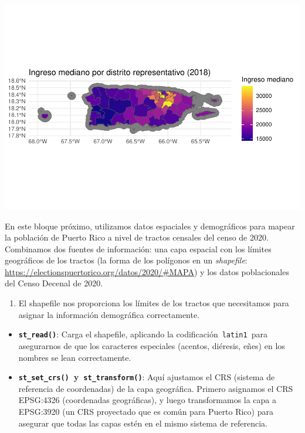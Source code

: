 \documentclass[
]{article}
\providecommand{\tightlist}{%
  \setlength{\itemsep}{0pt}\setlength{\parskip}{0pt}}
\begin{document}
\includegraphics{Taller-2_files/figure-latex/Ingreso mediano en mapa-1.pdf}

En este bloque próximo, utilizamos datos espaciales y demográficos para
mapear la población de Puerto Rico a nivel de tractos censales del censo
de 2020. Combinamos dos fuentes de información: una capa espacial con
los límites geográficos de los tractos (la forma de los polígonos en un
\emph{shapefile}:
\url{https://electionspuertorico.org/datos/2020/\#MAPA}) y los datos
poblacionales del Censo Decenal de 2020.

\begin{enumerate}
\def\labelenumi{\arabic{enumi}.}
\tightlist
\item
  El shapefile nos proporciona los límites de los tractos que
  necesitamos para asignar la información demográfica correctamente.
\end{enumerate}

\begin{itemize}
\item
  \textbf{\texttt{st\_read()}}: Carga el shapefile, aplicando la
  codificación~\texttt{latin1}~para asegurarnos de que los caracteres
  especiales (acentos, diéresis, eñes) en los nombres se lean
  correctamente.
\item
  \textbf{\texttt{st\_set\_crs()}~y~\texttt{st\_transform()}}: Aquí
  ajustamos el CRS (sistema de referencia de coordenadas) de la capa
  geográfica. Primero asignamos el CRS EPSG:4326 (coordenadas
  geográficas), y luego transformamos la capa a EPSG:3920 (un CRS
  proyectado que es común para Puerto Rico) para asegurar que todas las
  capas estén en el mismo sistema de referencia.
\end{itemize}
\end{document}
